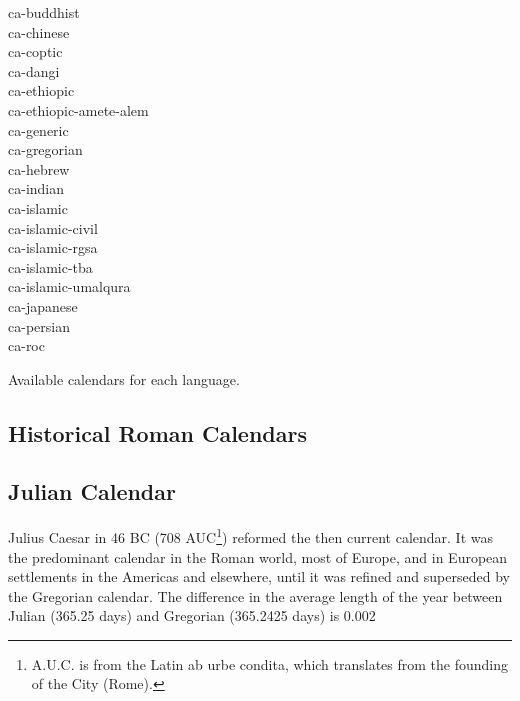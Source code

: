 \begin{table}[ht]

\begin{multicols}{2}
ca-buddhist\\
ca-chinese\\
ca-coptic\\
ca-dangi\\
ca-ethiopic\\
ca-ethiopic-amete-alem\\
ca-generic\\
ca-gregorian\\
ca-hebrew\\
ca-indian\\
ca-islamic\\
ca-islamic-civil\\
ca-islamic-rgsa\\
ca-islamic-tba\\
ca-islamic-umalqura\\
ca-japanese\\
ca-persian\\
ca-roc\\
\end{multicols}
\caption{Available calendars for each language.}
\end{table}

\subsection{Historical Roman Calendars}


\subsection{Julian Calendar}

Julius Caesar in 46 BC (708 AUC\footnote{A.U.C. is from the Latin ab urbe condita, which translates from the founding of the City (Rome).}) reformed the then current calendar.   It was the predominant calendar in the Roman world, most of Europe, and in European settlements in the Americas and elsewhere, until it was refined and superseded by the Gregorian calendar. The difference in the average length of the year between Julian (365.25 days) and Gregorian (365.2425 days) is 0.002%

